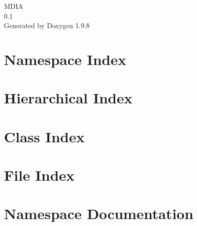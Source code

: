 \documentclass[twoside]{book}
\newcommand{\+}{\discretionary{\mbox{\scriptsize$\hookleftarrow$}}{}{}}
\newcommand{\clearemptydoublepage}{%
    \newpage{\pagestyle{empty}\cleardoublepage}%
  }
\begin{document}
  \raggedbottom
    \hypersetup{pageanchor=false,
                bookmarksnumbered=true,
                pdfencoding=unicode
               }
  \begin{titlepage}
  \vspace*{7cm}
  \begin{center}%
  {\Large MDIA}\\
  [1ex]\large 0.\+1 \\
  \vspace*{1cm}
  {\large Generated by Doxygen 1.9.8}\\
  \end{center}
  \end{titlepage}
  \clearemptydoublepage
  \tableofcontents
  \clearemptydoublepage
  \hypersetup{pageanchor=true}
\chapter{Namespace Index}

\chapter{Hierarchical Index}

\chapter{Class Index}

\chapter{File Index}

\chapter{Namespace Documentation}





































\end{document}
